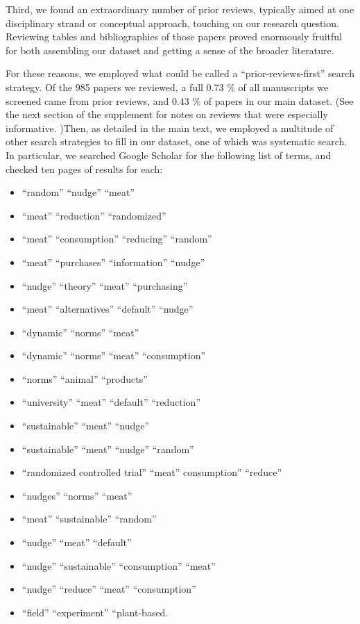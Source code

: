 \documentclass[sn-nature,referee,pdflatex]{sn-jnl}
\providecommand{\tightlist}{%
  \setlength{\itemsep}{0pt}\setlength{\parskip}{0pt}}
\begin{document}
Third, we found an extraordinary number of prior reviews, typically
aimed at one disciplinary strand or conceptual approach, touching on our
research question. Reviewing tables and bibliographies of those papers
proved enormously fruitful for both assembling our dataset and getting a
sense of the broader literature.

For these reasons, we employed what could be called a
``prior-reviews-first'' search strategy. Of the 985 papers we reviewed,
a full 0.73 \% of all manuscripts we screened came from prior reviews,
and 0.43 \% of papers in our main dataset. (See the next section of the
supplement for notes on reviews that were especially informative. )Then,
as detailed in the main text, we employed a multitude of other search
strategies to fill in our dataset, one of which was systematic search.
In particular, we searched Google Scholar for the following list of
terms, and checked ten pages of results for each:

\begin{itemize}
\tightlist
\item
  ``random'' ``nudge'' ``meat''
\item
  ``meat'' ``reduction'' ``randomized''
\item
  ``meat'' ``consumption'' ``reducing'' ``random''
\item
  ``meat'' ``purchases'' ``information'' ``nudge''
\item
  ``nudge'' ``theory'' ``meat'' ``purchasing''
\item
  ``meat'' ``alternatives'' ``default'' ``nudge''
\item
  ``dynamic'' ``norms'' ``meat''
\item
  ``dynamic'' ``norms'' ``meat'' ``consumption''
\item
  ``norms'' ``animal'' ``products''
\item
  ``university'' ``meat'' ``default'' ``reduction''
\item
  ``sustainable'' ``meat'' ``nudge''
\item
  ``sustainable'' ``meat'' ``nudge'' ``random''
\item
  ``randomized controlled trial'' ``meat'' consumption'' ``reduce''
\item
  ``nudges'' ``norms'' ``meat''
\item
  ``meat'' ``sustainable'' ``random''
\item
  ``nudge'' ``meat'' ``default''
\item
  ``nudge'' ``sustainable'' ``consumption'' ``meat''
\item
  ``nudge'' ``reduce'' ``meat'' ``consumption''
\item
  ``field'' ``experiment'' ``plant-based.
\end{itemize}
\end{document}

